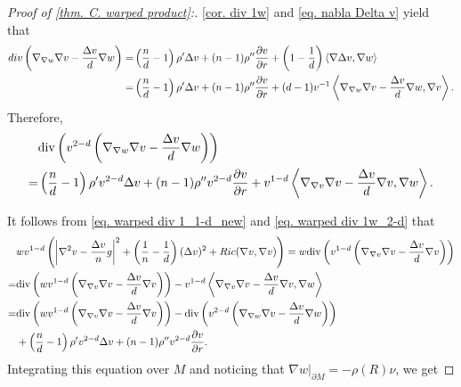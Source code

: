 \documentclass[12pt]{amsart}%
\numberwithin{equation}{section}
\numberwithin{lemma}{section}
\numberwithin{proposition}{section}
\numberwithin{corollary}{section}
\numberwithin{remark}{section}
\begin{document}
\begin{proof}[Proof of \cref{thm. C. warped product}:]
    \cref{cor. div 1w} and \cref{eq. nabla Delta v} yield that
        \begin{align}\label{eq. warped div hessian v}
            div\left(\nabla_{\nabla w}\nabla v-\frac{\Delta v}{d}\nabla w\right)
            =&\left(\frac{n}{d}-1\right)\rho'\Delta v
            +(n-1)\rho''\frac{\partial v}{\partial r}
            +\left(1-\frac{1}{d}\right)\langle\nabla \Delta v,\nabla w\rangle\notag\\
            =&\left(\frac{n}{d}-1\right)\rho'\Delta v
            +(n-1)\rho''\frac{\partial v}{\partial r}
            +(d-1)v^{-1}\left\langle
             \nabla_{\nabla w}\nabla v-\frac{\Delta v}{d}\nabla w,\nabla v\right\rangle.
        \end{align}
        Therefore,
        \begin{align}\label{eq. warped div 1w_2-d}
        &\mathrm{div}\left(
        v^{2-d}
        \left(\nabla_{\nabla w}\nabla v-\frac{\Delta v}{d}\nabla w\right)
        \right)\notag\\
        =&\left(\frac{n}{d}-1\right)
        \rho'v^{2-d}\Delta v
        +(n-1)\rho''v^{2-d}\frac{\partial v}{\partial r}
        +v^{1-d}
        \left\langle\nabla_{\nabla v}\nabla v-\frac{\Delta v}{d}\nabla v,\nabla w\right\rangle.
    \end{align}

    It follows from \cref{eq. warped div 1_1-d_new} and \cref{eq. warped div 1w_2-d} that
    \begin{align*}
        &wv^{1-d}\left(
        \left|\nabla^2 v-\frac{\Delta v}{n}g\right|^2
        +\left(\frac{1}{n}-\frac{1}{d}\right)(\Delta v)^2
        +Ric(\nabla v,\nabla v)
        \right)
        =w\mathrm{div}\left(
        v^{1-d}\left(\nabla_{\nabla v}\nabla v-\frac{\Delta v}{d}\nabla v\right)
        \right)\notag\\
        =&\mathrm{div}\left(
        wv^{1-d}
        \left(\nabla_{\nabla v}\nabla v-\frac{\Delta v}{d}\nabla v\right)
        \right)
        -v^{1-d}\left\langle\nabla_{\nabla v}\nabla v-\frac{\Delta v}{d}\nabla v,\nabla w\right\rangle\notag\\
        =&\mathrm{div}\left(
        wv^{1-d}\left(\nabla_{\nabla v}\nabla v-\frac{\Delta v}{d}\nabla v\right)
        \right)
        -\mathrm{div}\left(
        v^{2-d}
        \left(\nabla_{\nabla w}\nabla v-\frac{\Delta v}{d}\nabla w\right)
        \right)\\
        &+\left(\frac{n}{d}-1\right)\rho'v^{2-d}\Delta v
        +(n-1)\rho''v^{2-d}\frac{\partial v}{\partial r}.
    \end{align*}
    Integrating this equation over $M$ and noticing that $\nabla w|_{\partial M}=-\rho(R)\nu$, we get


\end{proof}
\end{document}
